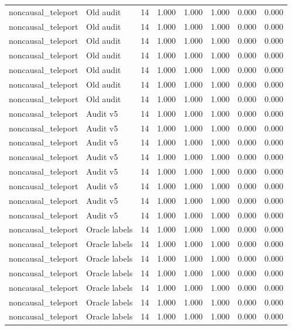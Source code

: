 {\begin{longtable}{llrrrrrr}
noncausal\_teleport & Old audit & 14 & 1.000 & 1.000 & 1.000 & 0.000 & 0.000 \\
noncausal\_teleport & Old audit & 14 & 1.000 & 1.000 & 1.000 & 0.000 & 0.000 \\
noncausal\_teleport & Old audit & 14 & 1.000 & 1.000 & 1.000 & 0.000 & 0.000 \\
noncausal\_teleport & Old audit & 14 & 1.000 & 1.000 & 1.000 & 0.000 & 0.000 \\
noncausal\_teleport & Old audit & 14 & 1.000 & 1.000 & 1.000 & 0.000 & 0.000 \\
noncausal\_teleport & Old audit & 14 & 1.000 & 1.000 & 1.000 & 0.000 & 0.000 \\
noncausal\_teleport & Old audit & 14 & 1.000 & 1.000 & 1.000 & 0.000 & 0.000 \\
noncausal\_teleport & Audit v5 & 14 & 1.000 & 1.000 & 1.000 & 0.000 & 0.000 \\
noncausal\_teleport & Audit v5 & 14 & 1.000 & 1.000 & 1.000 & 0.000 & 0.000 \\
noncausal\_teleport & Audit v5 & 14 & 1.000 & 1.000 & 1.000 & 0.000 & 0.000 \\
noncausal\_teleport & Audit v5 & 14 & 1.000 & 1.000 & 1.000 & 0.000 & 0.000 \\
noncausal\_teleport & Audit v5 & 14 & 1.000 & 1.000 & 1.000 & 0.000 & 0.000 \\
noncausal\_teleport & Audit v5 & 14 & 1.000 & 1.000 & 1.000 & 0.000 & 0.000 \\
noncausal\_teleport & Audit v5 & 14 & 1.000 & 1.000 & 1.000 & 0.000 & 0.000 \\
noncausal\_teleport & Audit v5 & 14 & 1.000 & 1.000 & 1.000 & 0.000 & 0.000 \\
noncausal\_teleport & Oracle labels & 14 & 1.000 & 1.000 & 1.000 & 0.000 & 0.000 \\
noncausal\_teleport & Oracle labels & 14 & 1.000 & 1.000 & 1.000 & 0.000 & 0.000 \\
noncausal\_teleport & Oracle labels & 14 & 1.000 & 1.000 & 1.000 & 0.000 & 0.000 \\
noncausal\_teleport & Oracle labels & 14 & 1.000 & 1.000 & 1.000 & 0.000 & 0.000 \\
noncausal\_teleport & Oracle labels & 14 & 1.000 & 1.000 & 1.000 & 0.000 & 0.000 \\
noncausal\_teleport & Oracle labels & 14 & 1.000 & 1.000 & 1.000 & 0.000 & 0.000 \\
noncausal\_teleport & Oracle labels & 14 & 1.000 & 1.000 & 1.000 & 0.000 & 0.000 \\

\end{longtable}}
